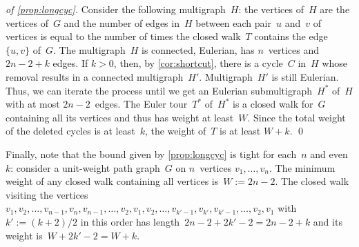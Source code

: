 \documentclass[natbib,sort,smallextended,envcountsame,envcountsect,numbook]{svjour3}
\begin{document}
\begin{proof}[of \cref{prop:longcyc}]
  Consider the following multigraph~$H$:
  the vertices of~\(H\) are the vertices of~\(G\)
  and
  the number of edges in~\(H\) between
  each pair~\(u\) and~\(v\) of vertices
  is equal to the number of times
  the closed walk~\(T\) contains the edge~$\{u,v\}$ of~\(G\).
  The multigraph~$H$ is connected, Eulerian, has \(n\)~vertices
  and $2n-2+k$ edges.
  If $k>0$, then, by \cref{cor:shortcut},
  there is a cycle~$C$ in~$H$ whose removal results
  in a connected multigraph~\(H'\).
  Multigraph~\(H'\) is still Eulerian.
  Thus,
  we can iterate the process until
  we get an Eulerian submultigraph~\(H^*\) of~\(H\) with at most $2n-2$~edges.
  The Euler tour~$T^*$ of~\(H^*\)
  is a closed walk for~\(G\) containing all its vertices
  and thus
  has weight at least~\(W\).
  Since the total weight of the deleted cycles is at least~$k$,
  the weight of~$T$ is at least $W+k$.
 \qed
\end{proof}
Finally, note that the bound given by \cref{prop:longcyc}
is tight for each~\(n\) and even~\(k\):
consider a unit-weight path graph~\(G\) on \(n\)~vertices \(v_1,\dots,v_n\).
The minimum weight of any closed walk containing all vertices is~\(W:=2n-2\).
The closed walk visiting the vertices
\(v_1,v_2,\dots,v_{n-1},v_n,v_{n-1},\dots,v_2,v_1,v_2,\dots,v_{k'-1},v_{k'},v_{k'-1},\dots,\allowbreak v_2,v_1\)
with \(k':=(k+2)/2\) in this order
has length~\(2n-2+2k'-2=2n-2+k\) and its weight is~\(W+2k'-2=W+k\).
\end{document}
